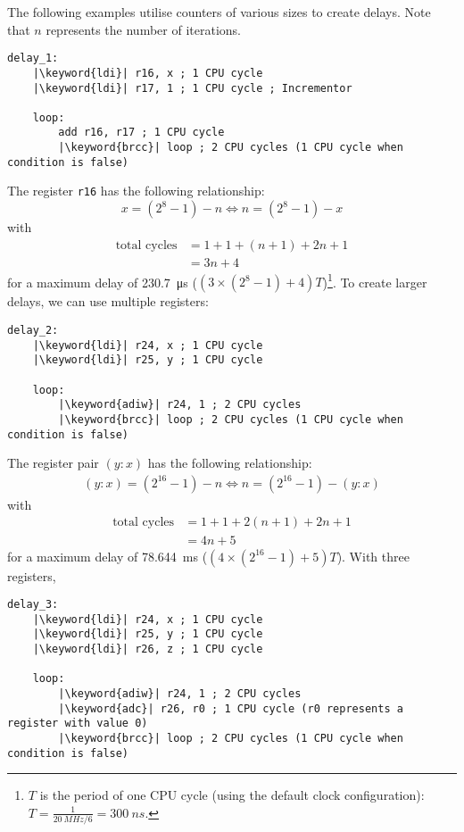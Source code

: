 \documentclass[a4paper]{report}
\newcommand{\keyword}[1]{\textcolor[rgb]{0.00,0.50,0.00}{\textbf{#1}}}
\begin{document}
The following examples utilise counters of various sizes to create
delays. Note that \(n\) represents the number of iterations.
\begin{verbatim}
delay_1:
    |\keyword{ldi}| r16, x ; 1 CPU cycle
    |\keyword{ldi}| r17, 1 ; 1 CPU cycle ; Incrementor

    loop:
        add r16, r17 ; 1 CPU cycle
        |\keyword{brcc}| loop ; 2 CPU cycles (1 CPU cycle when condition is false)
\end{verbatim}
The register \texttt{r16} has the following relationship:
\begin{equation*}
    x = \left( 2^8 - 1 \right) - n \iff n = \left( 2^8 - 1 \right) - x
\end{equation*}
with
\begin{align*}
    \text{total cycles} & = 1 + 1 + \left( n + 1 \right) + 2 n + 1 \\
                        & = 3 n + 4
\end{align*}
for a maximum delay of \qty{230.7}{\micro s} (\(\left( 3 \times \left( 2^8 - 1 \right) + 4 \right) T\))\footnote{\(T\) is the period of one CPU cycle (using the default clock configuration): \(T = \frac{1}{\qty{20}{MHz} / 6} = \qty{300}{ns}\).}.
To create larger delays, we can use multiple registers:
\begin{verbatim}
delay_2:
    |\keyword{ldi}| r24, x ; 1 CPU cycle
    |\keyword{ldi}| r25, y ; 1 CPU cycle

    loop:
        |\keyword{adiw}| r24, 1 ; 2 CPU cycles
        |\keyword{brcc}| loop ; 2 CPU cycles (1 CPU cycle when condition is false)
\end{verbatim}
The register pair \(\left( y:x \right)\) has the following
relationship:
\begin{align*}
    \left( y:x \right) = \left( 2^{16} - 1 \right) - n \iff n = \left( 2^{16} - 1 \right) - \left( y:x \right)
\end{align*}
with
\begin{align*}
    \text{total cycles} & = 1 + 1 + 2 \left( n + 1 \right) + 2 n + 1 \\
                        & = 4n + 5
\end{align*}
for a maximum delay of \qty{78.644}{ms} (\(\left(4 \times \left( 2^{16} - 1 \right) + 5 \right) T\)).
With three registers,
\begin{verbatim}
delay_3:
    |\keyword{ldi}| r24, x ; 1 CPU cycle
    |\keyword{ldi}| r25, y ; 1 CPU cycle
    |\keyword{ldi}| r26, z ; 1 CPU cycle

    loop:
        |\keyword{adiw}| r24, 1 ; 2 CPU cycles
        |\keyword{adc}| r26, r0 ; 1 CPU cycle (r0 represents a register with value 0)
        |\keyword{brcc}| loop ; 2 CPU cycles (1 CPU cycle when condition is false)
\end{verbatim}
\end{document}
